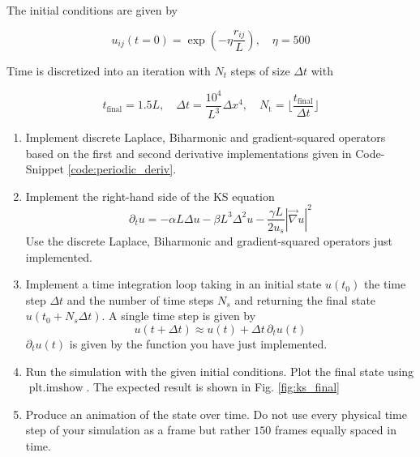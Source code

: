     The initial conditions are given by

    \begin{equation}
        u_{ij}(t = 0) = \exp{\left(-\eta \frac{r_{ij}}{L}\right)}, \quad \eta = 500
    \end{equation}

    Time is discretized into an iteration with $N_t$ steps of size $\Delta t$ with

    \begin{equation}
        t_\text{final} = 1.5 L, \quad \Delta t = \frac{10^4}{L^3} \Delta x^4, \quad N_\text{t} = \lfloor \frac{t_\text{final}}{\Delta t} \rfloor
    \end{equation}

    \begin{enumerate}
        \item Implement discrete Laplace, Biharmonic and gradient-squared
        operators based on the first and second derivative implementations
        given in Code-Snippet \ref{code:periodic_deriv}.
        \item Implement the right-hand side of the KS equation
        \begin{equation}
            \partial_t u = -\alpha L \Delta u - \beta L^3 \Delta^2 u - \frac{\gamma L}{2u_s} |\vec{\nabla}u|^2
        \end{equation}
        Use the discrete Laplace, Biharmonic and gradient-squared
        operators just implemented.
        \item Implement a time integration loop taking in an initial state $u(t_0)$
        the time step $\Delta t$ and the number of time steps $N_s$ and returning
        the final state $u(t_0 + N_s \Delta t)$. A single time step is given by
        \begin{equation}
            u(t + \Delta t) \approx u(t) + \Delta t \, \partial_t u(t)
        \end{equation}
        $\partial_t u(t)$ is given by the function you have just implemented.
        \item Run the simulation with the given initial conditions. Plot the final state using $\operatorname{plt.imshow}$. The expected result is shown in Fig. \ref{fig:ks_final}
        \item Produce an animation of the state over time. Do not use every physical
        time step of your simulation as a frame but rather $150$ frames equally spaced in time.
    \end{enumerate}

